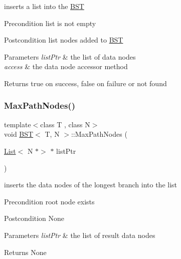 inserts a list into the \hyperlink{class_b_s_t}{B\+ST} \begin{DoxyPrecond}{Precondition}
list is not empty 
\end{DoxyPrecond}
\begin{DoxyPostcond}{Postcondition}
list nodes added to \hyperlink{class_b_s_t}{B\+ST} 
\end{DoxyPostcond}

\begin{DoxyParams}{Parameters}
{\em list\+Ptr} & the list of data nodes \\
\hline
{\em access} & the data node accessor method \\
\hline
\end{DoxyParams}
\begin{DoxyReturn}{Returns}
true on success, false on failure or not found 
\end{DoxyReturn}
\mbox{\label{class_b_s_t_a757799b702dc9729c0b7e63b63b91647}} 
\subsubsection{\texorpdfstring{Max\+Path\+Nodes()}{MaxPathNodes()}}
{\footnotesize\ttfamily template$<$class T , class N$>$ \\
void \hyperlink{class_b_s_t}{B\+ST}$<$ T, N $>$\+::Max\+Path\+Nodes (\begin{DoxyParamCaption}\item[{\hyperlink{class_list}{List}$<$ N $\ast$$>$ $\ast$}]{list\+Ptr }\end{DoxyParamCaption})}

inserts the data nodes of the longest branch into the list \begin{DoxyPrecond}{Precondition}
root node exists 
\end{DoxyPrecond}
\begin{DoxyPostcond}{Postcondition}
None 
\end{DoxyPostcond}

\begin{DoxyParams}{Parameters}
{\em list\+Ptr} & the list of result data nodes \\
\hline
\end{DoxyParams}
\begin{DoxyReturn}{Returns}
None 
\end{DoxyReturn}
\mbox{\label{class_b_s_t_a86fb81e20a21ef65e2b57e55d910d875}} 
